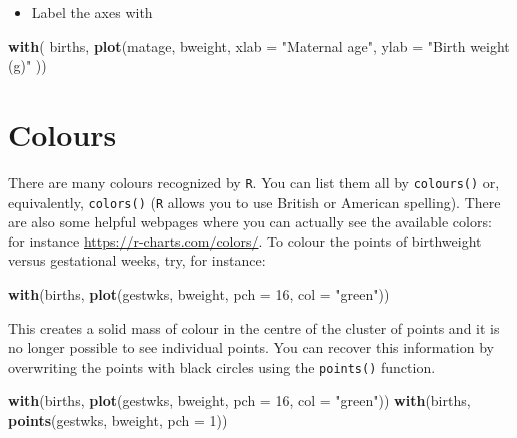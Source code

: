 \documentclass[
]{book}
\newenvironment{Shaded}{\begin{snugshade}}{\end{snugshade}}
\newcommand{\AttributeTok}[1]{\textcolor[rgb]{0.13,0.29,0.53}{#1}}
\newcommand{\DecValTok}[1]{\textcolor[rgb]{0.00,0.00,0.81}{#1}}
\newcommand{\FunctionTok}[1]{\textcolor[rgb]{0.13,0.29,0.53}{\textbf{#1}}}
\newcommand{\NormalTok}[1]{#1}
\newcommand{\StringTok}[1]{\textcolor[rgb]{0.31,0.60,0.02}{#1}}
\providecommand{\tightlist}{%
  \setlength{\itemsep}{0pt}\setlength{\parskip}{0pt}}
\begin{document}
\begin{itemize}
\tightlist
\item
  Label the axes with
\end{itemize}

\begin{Shaded}
\begin{Highlighting}[]
\FunctionTok{with}\NormalTok{( births, }
  \FunctionTok{plot}\NormalTok{(matage, bweight, }
    \AttributeTok{xlab =} \StringTok{"Maternal age"}\NormalTok{, }
    \AttributeTok{ylab =} \StringTok{"Birth weight (g)"}
\NormalTok{  ))}
\end{Highlighting}
\end{Shaded}

\section{Colours}\label{colours}

There are many colours recognized by \texttt{R}. You can list them all by
\texttt{colours()} or, equivalently, \texttt{colors()} (\texttt{R} allows you to
use British or American spelling). There are also some helpful webpages where you can actually see the available colors: for instance \url{https://r-charts.com/colors/}. To colour the points of birthweight
versus gestational weeks, try, for instance:

\begin{Shaded}
\begin{Highlighting}[]
\FunctionTok{with}\NormalTok{(births, }\FunctionTok{plot}\NormalTok{(gestwks, bweight, }\AttributeTok{pch =} \DecValTok{16}\NormalTok{, }\AttributeTok{col =} \StringTok{"green"}\NormalTok{))}
\end{Highlighting}
\end{Shaded}

This creates a solid mass of colour in the centre of the cluster of
points and it is no longer possible to see individual points. You can
recover this information by overwriting the points with black circles
using the \texttt{points()} function.

\begin{Shaded}
\begin{Highlighting}[]
\FunctionTok{with}\NormalTok{(births, }\FunctionTok{plot}\NormalTok{(gestwks, bweight, }\AttributeTok{pch =} \DecValTok{16}\NormalTok{, }\AttributeTok{col =} \StringTok{"green"}\NormalTok{))}
\FunctionTok{with}\NormalTok{(births, }\FunctionTok{points}\NormalTok{(gestwks, bweight, }\AttributeTok{pch =} \DecValTok{1}\NormalTok{))}
\end{Highlighting}
\end{Shaded}
\end{document}
